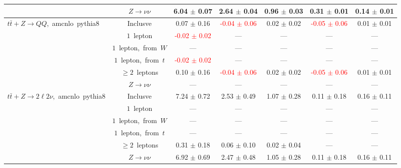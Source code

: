 \documentclass{article}
\begin{document}
\begin{longtable}{|l|c|c|c|c|c|c|}
 & $Z\rightarrow\nu\nu$  & 6.04 $\pm$ 0.07  & 2.64 $\pm$ 0.04  & 0.96 $\pm$ 0.03  & 0.31 $\pm$ 0.01  & 0.14 $\pm$ 0.01 \\* 
\hline 
\multirow{6}{*}{$t\bar{t}+Z{\rightarrow}QQ$,~amcnlo~pythia8} & Inclusve  & 0.07 $\pm$ 0.16  & \textcolor{red}{ -0.04 $\pm$ 0.06 }  & 0.02 $\pm$ 0.02  & \textcolor{red}{ -0.05 $\pm$ 0.06 }  & 0.01 $\pm$ 0.01 \\* 
 & $1$~lepton  & \textcolor{red}{ -0.02 $\pm$ 0.02 }  & ---  & ---  & ---  & --- \\* 
 & $1$~lepton,~from~$W$  & ---  & ---  & ---  & ---  & --- \\* 
 & $1$~lepton,~from~$t$  & \textcolor{red}{ -0.02 $\pm$ 0.02 }  & ---  & ---  & ---  & --- \\* 
 & $\ge2$~leptons  & 0.10 $\pm$ 0.16  & \textcolor{red}{ -0.04 $\pm$ 0.06 }  & 0.02 $\pm$ 0.02  & \textcolor{red}{ -0.05 $\pm$ 0.06 }  & 0.01 $\pm$ 0.01 \\* 
 & $Z\rightarrow\nu\nu$  & ---  & ---  & ---  & ---  & --- \\* 
\hline 
\multirow{6}{*}{$t\bar{t}+Z{\rightarrow}2{\ell}2{\nu}$,~amcnlo~pythia8} & Inclusve  & 7.24 $\pm$ 0.72  & 2.53 $\pm$ 0.49  & 1.07 $\pm$ 0.28  & 0.11 $\pm$ 0.18  & 0.16 $\pm$ 0.11 \\* 
 & $1$~lepton  & ---  & ---  & ---  & ---  & --- \\* 
 & $1$~lepton,~from~$W$  & ---  & ---  & ---  & ---  & --- \\* 
 & $1$~lepton,~from~$t$  & ---  & ---  & ---  & ---  & --- \\* 
 & $\ge2$~leptons  & 0.31 $\pm$ 0.18  & 0.06 $\pm$ 0.10  & 0.02 $\pm$ 0.04  & ---  & --- \\* 
 & $Z\rightarrow\nu\nu$  & 6.92 $\pm$ 0.69  & 2.47 $\pm$ 0.48  & 1.05 $\pm$ 0.28  & 0.11 $\pm$ 0.18  & 0.16 $\pm$ 0.11 \\* 
\hline 
\end{longtable} 

 
 
 
 
\pagebreak 

 
 
 
 
\end{document}
